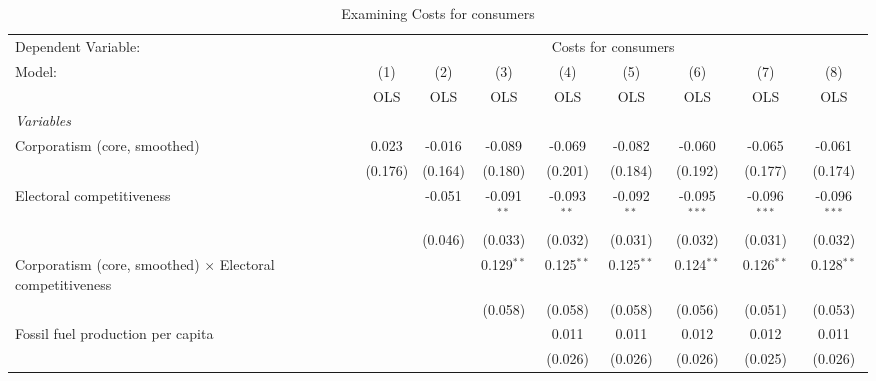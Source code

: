 
\begin{table}[htbp]
   \caption{Examining Costs for consumers}
   \centering
   \begin{tabular}{lcccccccc}
      \toprule
      Dependent Variable: & \multicolumn{8}{c}{Costs for consumers}\\
      Model:                                                           & (1)     & (2)     & (3)           & (4)           & (5)           & (6)            & (7)            & (8)\\  
                                                                       &  OLS    & OLS     & OLS           & OLS           & OLS           & OLS            & OLS            & OLS\\  
      \midrule
      \emph{Variables}\\
      Corporatism (core, smoothed)                                     & 0.023   & -0.016  & -0.089        & -0.069        & -0.082        & -0.060         & -0.065         & -0.061\\   
                                                                       & (0.176) & (0.164) & (0.180)       & (0.201)       & (0.184)       & (0.192)        & (0.177)        & (0.174)\\   
      Electoral competitiveness                                        &         & -0.051  & -0.091$^{**}$ & -0.093$^{**}$ & -0.092$^{**}$ & -0.095$^{***}$ & -0.096$^{***}$ & -0.096$^{***}$\\   
                                                                       &         & (0.046) & (0.033)       & (0.032)       & (0.031)       & (0.032)        & (0.031)        & (0.032)\\   
      Corporatism (core, smoothed) $\times$ Electoral competitiveness  &         &         & 0.129$^{**}$  & 0.125$^{**}$  & 0.125$^{**}$  & 0.124$^{**}$   & 0.126$^{**}$   & 0.128$^{**}$\\   
                                                                       &         &         & (0.058)       & (0.058)       & (0.058)       & (0.056)        & (0.051)        & (0.053)\\   
      Fossil fuel production per capita                                &         &         &               & 0.011         & 0.011         & 0.012          & 0.012          & 0.011\\   
                                                                       &         &         &               & (0.026)       & (0.026)       & (0.026)        & (0.025)        & (0.026)\\   

\end{tabular}
\end{table}
